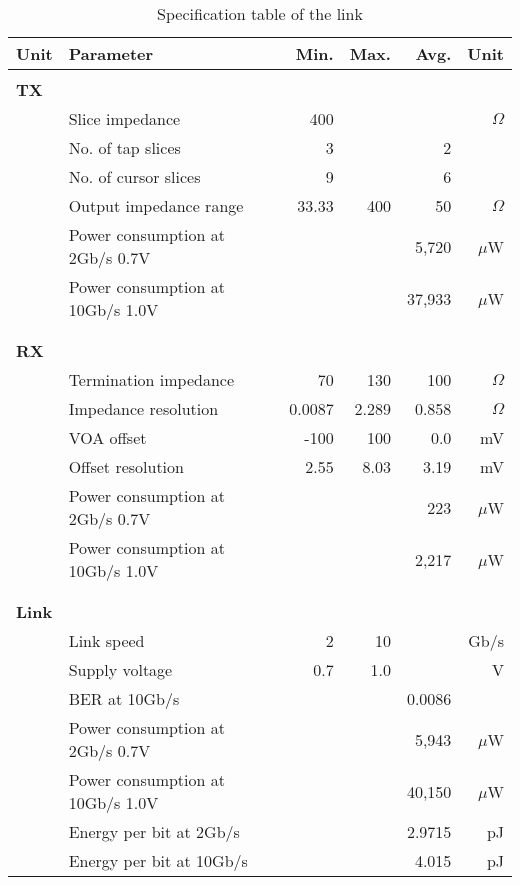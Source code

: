 \begin{table}[H]
  \centering
  \begin{tabular}{l l|r|r|r|r}
 Unit  & Parameter & Min. & Max. & Avg. & Unit \\
    \hline
    & & & & &\\
\textbf{TX} & & & & &\\
&	Slice impedance & 400 &  &  & $\Omega$\\
&	No. of tap slices & 3 &  & 2 & \\
&	No. of cursor slices & 9 &  & 6 & \\
&	Output impedance range & 33.33 & 400 & 50 & $\Omega$\\
&	Power consumption at 2Gb/s 0.7V &  &  & 5,720 & $\mu$W\\
&	Power consumption at 10Gb/s 1.0V &  &  & 37,933 & $\mu$W\\

    & & & & &\\
   	\hline
    & & & & &\\
\textbf{RX} & & & & &\\
&	Termination impedance & 70 & 130 & 100 & $\Omega$\\
&	Impedance resolution & 0.0087 & 2.289 & 0.858 & $\Omega$\\
&	VOA offset & -100 & 100 & 0.0 & mV\\
&	Offset resolution & 2.55 & 8.03 & 3.19 & mV\\
&	Power consumption at 2Gb/s 0.7V &  &  & 223  & $\mu$W\\
&	Power consumption at 10Gb/s 1.0V &&  &  2,217  & $\mu$W\\

    & & & & &\\
    \hline
    & & & & &\\
\textbf{Link} & & & & &\\
&	Link speed & 2 & 10 &  & Gb/s \\
&	Supply voltage  & 0.7 & 1.0 &  & V\\
&	BER at 10Gb/s  &  &  & 0.0086 & \\
&	Power consumption at 2Gb/s 0.7V &  &  & 5,943 & $\mu$W\\
&	Power consumption at 10Gb/s 1.0V &  &  & 40,150 & $\mu$W\\
&   Energy per bit at 2Gb/s &  & & 2.9715 & pJ \\
&   Energy per bit at 10Gb/s &  & & 4.015 & pJ \\
  \end{tabular}
  \caption{Specification table of the link}
  \label{tab:final_specifications}
\end{table}